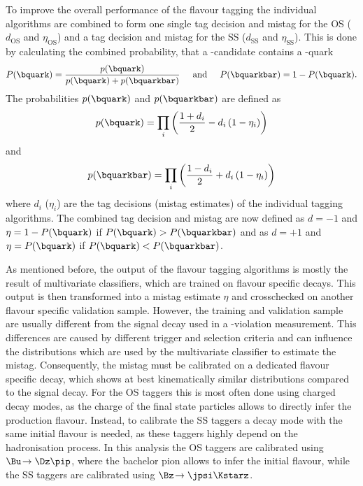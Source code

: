 To improve the overall performance of the flavour tagging the individual algorithms are combined to form one single tag decision and mistag for the OS ($d_{\text{OS}}$ and $\eta_{\text{OS}}$) and a tag decision and mistag for the SS ($d_{\text{SS}}$ and $\eta_{\text{SS}}$).
This is done by calculating the combined probability, that a \B-candidate contains a \bquark-quark
\begin{equation}
P(\bquark)=\frac{p(\bquark)}{p(\bquark)+p(\bquarkbar)}\hspace{0.5cm}\text{and}\hspace{0.5cm}P(\bquarkbar)=1-P(\bquark).
\end{equation}
The probabilities $p(\bquark)$ and $p(\bquarkbar)$ are defined as
\begin{equation}
p(\bquark)=\prod_{i}\left(\frac{1+d_i}{2}-d_i\left(1-\eta_i\right)\right)
\end{equation}
and
\begin{equation}
p(\bquarkbar)=\prod_{i}\left(\frac{1-d_i}{2}+d_i\left(1-\eta_i\right)\right)
\end{equation}
where $d_i$ ($\eta_i$) are the tag decisions (mistag estimates) of the individual tagging algorithms.
The combined tag decision and mistag are now defined as $d=-1$ and $\eta=1-P(\bquark)$ if $P(\bquark)>P(\bquarkbar)$ and as $d=+1$ and $\eta=P(\bquark)$ if $P(\bquark)<P(\bquarkbar)$.

As mentioned before, the output of the flavour tagging algorithms is mostly the result of multivariate classifiers, which are trained on flavour specific \B decays.
This output is then transformed into a mistag estimate $\eta$ and crosschecked on another flavour specific validation sample.
However, the training and validation sample are usually different from the signal decay used in a \CP-violation measurement.
This differences are caused by different trigger and selection criteria and can influence the distributions which are used by the multivariate classifier to estimate the mistag.
Consequently, the mistag must be calibrated on a dedicated flavour specific decay, which shows at best kinematically similar distributions compared to the signal decay.
For the OS taggers this is most often done using charged decay modes, as the charge of the final state particles allows to directly infer the production flavour.
Instead, to calibrate the SS taggers a decay mode with the same initial \B flavour is needed, as these taggers highly depend on the hadronisation process.
In this analysis the OS taggers are calibrated using $\Bu\!\to\Dz\pip$, where the bachelor pion allows to infer the initial flavour, while the SS taggers are calibrated using $\Bz\!\to\jpsi\Kstarz$.

